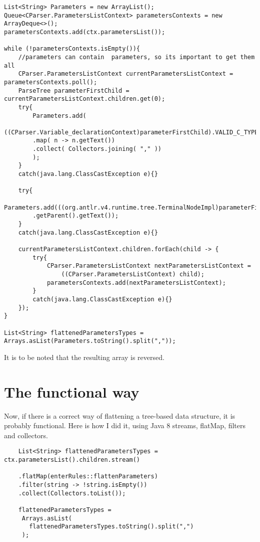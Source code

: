 \documentclass[twocolumn,10ptr]{article}
\begin{document}
	
	\begin{lstlisting}



List<String> Parameters = new ArrayList();
Queue<CParser.ParametersListContext> parametersContexts = new ArrayDeque<>();
parametersContexts.add(ctx.parametersList());

while (!parametersContexts.isEmpty()){
	//parameters can contain  parameters, so its important to get them all
	CParser.ParametersListContext currentParametersListContext = parametersContexts.poll();
	ParseTree parameterFirstChild = currentParametersListContext.children.get(0);
	try{
		Parameters.add(
		((CParser.Variable_declarationContext)parameterFirstChild).VALID_C_TYPES().stream()
		.map( n -> n.getText())
		.collect( Collectors.joining( "," ))
		);	
	}
	catch(java.lang.ClassCastException e){}
	
	try{
		Parameters.add(((org.antlr.v4.runtime.tree.TerminalNodeImpl)parameterFirstChild)
		.getParent().getText());	
	}
	catch(java.lang.ClassCastException e){}
	
	currentParametersListContext.children.forEach(child -> { 
		try{
			CParser.ParametersListContext nextParametersListContext =
				((CParser.ParametersListContext) child);
			parametersContexts.add(nextParametersListContext);
		}
		catch(java.lang.ClassCastException e){}
	});
}

List<String> flattenedParametersTypes = Arrays.asList(Parameters.toString().split(","));

	\end{lstlisting}
	
	It is to be noted that the resulting array is reversed.
	
	
	\section{The functional way}
	Now, if there is a correct way of flattening a tree-based data structure, it is probably functional. Here is how I did it, using Java 8 streams, flatMap, filters and  collectors.\\
	
	\begin{lstlisting}
	List<String> flattenedParametersTypes = ctx.parametersList().children.stream()
	
	.flatMap(enterRules::flattenParameters)
	.filter(string -> !string.isEmpty())
	.collect(Collectors.toList());
	
	flattenedParametersTypes =
	 Arrays.asList(
	   flattenedParametersTypes.toString().split(",")
	 ); 
	\end{lstlisting}
	
\end{document}

